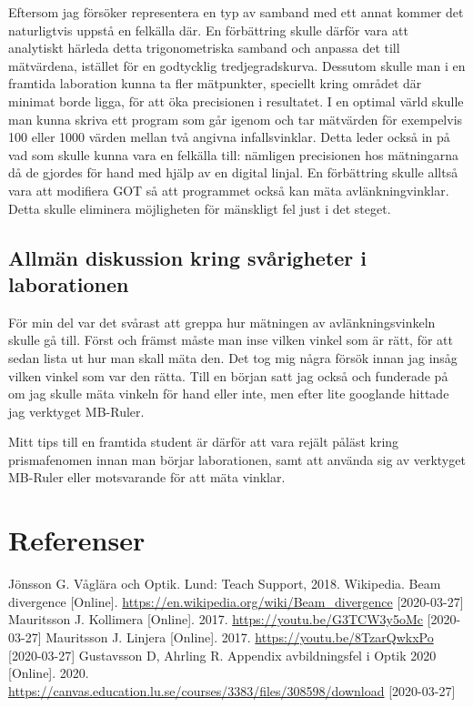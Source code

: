 \documentclass[a4paper]{article}
\begin{document}
Eftersom jag försöker representera en typ av samband med ett annat kommer det naturligtvis uppstå en felkälla där. En förbättring skulle
därför vara att analytiskt härleda detta trigonometriska samband och anpassa det till mätvärdena, istället för en godtycklig tredjegradskurva. Dessutom skulle
man i en framtida laboration kunna ta fler mätpunkter, speciellt kring området där minimat borde ligga, för att öka precisionen i resultatet.
I en optimal värld skulle man kunna skriva ett program som går igenom och tar mätvärden för exempelvis 100 eller 1000 värden mellan två angivna
infallsvinklar. Detta leder också in på vad som skulle kunna vara en felkälla till: nämligen precisionen hos mätningarna då de gjordes för hand
med hjälp av en digital linjal. En förbättring skulle alltså vara att modifiera GOT så att programmet också kan mäta avlänkningvinklar. Detta skulle
eliminera möjligheten för mänskligt fel just i det steget.

\subsection{Allmän diskussion kring svårigheter i laborationen}
För min del var det svårast att greppa hur mätningen av avlänkningsvinkeln skulle gå till. Först och främst måste man inse vilken vinkel som är
rätt, för att sedan lista ut hur man skall mäta den. Det tog mig några försök innan jag insåg vilken vinkel som var den rätta. Till en början 
satt jag också och funderade på om jag skulle mäta vinkeln för hand eller inte, men efter lite googlande hittade jag verktyget MB-Ruler.

Mitt tips till en framtida student är därför att vara rejält påläst kring prismafenomen innan man börjar laborationen, samt att använda sig av
verktyget MB-Ruler eller motsvarande för att mäta vinklar.

\section{Referenser}
\begingroup
\renewcommand{\section}[2]{}
\begin{thebibliography}{1}
    
    Jönsson G. Våglära och Optik. Lund: Teach Support, 2018.
    Wikipedia. Beam divergence [Online]. \url{https://en.wikipedia.org/wiki/Beam_divergence} [2020-03-27]
    Mauritsson J. Kollimera [Online]. 2017. \url{https://youtu.be/G3TCW3y5oMc} [2020-03-27]
    Mauritsson J. Linjera [Online]. 2017. \url{https://youtu.be/8TzarQwkxPo} [2020-03-27]
    Gustavsson D, Ahrling R. Appendix avbildningsfel i Optik 2020 [Online]. 2020. \url{https://canvas.education.lu.se/courses/3383/files/308598/download} [2020-03-27]
\end{thebibliography}
\endgroup
\end{document}

